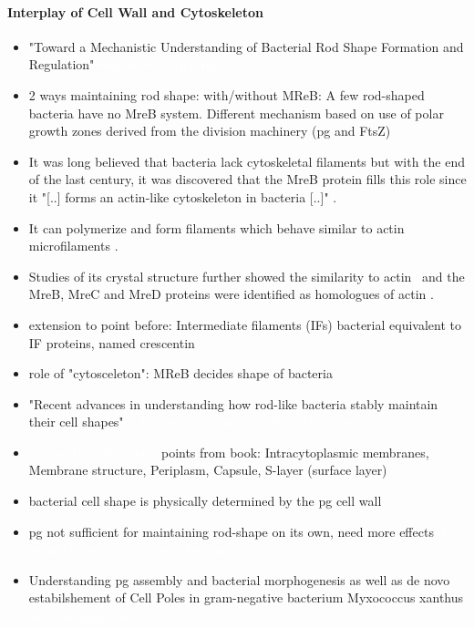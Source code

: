 \documentclass{article}
\newcommand{\todo}[1]{\colorbox{WildStrawberry}{\textcolor{white}{#1}}}
\begin{document}
\paragraph{Interplay of Cell Wall and Cytoskeleton}
\begin{itemize}
    \item \cite{Garner2021} "Toward a Mechanistic Understanding of Bacterial Rod Shape Formation and Regulation" \todo{why are we citing this?}
    \item \cite{Daniel2003} 2 ways maintaining rod shape: with/without MReB: A few rod-shaped bacteria have no MreB system.
        Different mechanism based on use of polar growth zones derived from the division machinery (\ac{pg} and FtsZ)
    \item It was long believed that bacteria lack cytoskeletal filaments but with the end of the last century, it was discovered that the MreB protein fills this role since it "[..] forms an actin-like cytoskeleton in bacteria [..]" \cite{Erickson2001}.
    \item It can polymerize and form filaments which behave similar to actin microfilaments \cite{Dersch2020}.
    \item Studies of its crystal structure further showed the similarity to actin~\cite{vandenEnt2001} and the MreB, MreC and MreD proteins were identified as homologues of actin \cite{Lowe2017_lj}.
    \item \cite{Ausmees2003} extension to point before: Intermediate filaments (IFs) bacterial equivalent to IF proteins, named crescentin
    \item \cite{Bratton2018} role of "cytosceleton": MReB decides shape of bacteria
    \item \cite{vanTeeffelen2018} "Recent advances in understanding how rod-like bacteria stably maintain their cell shapes" \todo{@Toqi what can we learn from this citation?}
    \item \cite{Shi2018} \todo{remove this when done} points from book: Intracytoplasmic membranes,
        Membrane structure, Periplasm, Capsule, S-layer (surface layer)
    \item \cite{Amir2014} bacterial cell shape is physically determined by the \ac{pg} cell wall
    \item \ac{pg} not sufficient for maintaining rod-shape on its own, need more effects \todo{do we need more details from this paper?}
    \item \cite{Huan2021} Understanding \ac{pg} assembly and bacterial morphogenesis as well as de novo estabilshement of Cell Poles in gram-negative bacterium Myxococcus xanthus \todo{sort this somewhere}
\end{itemize}
\end{document}
